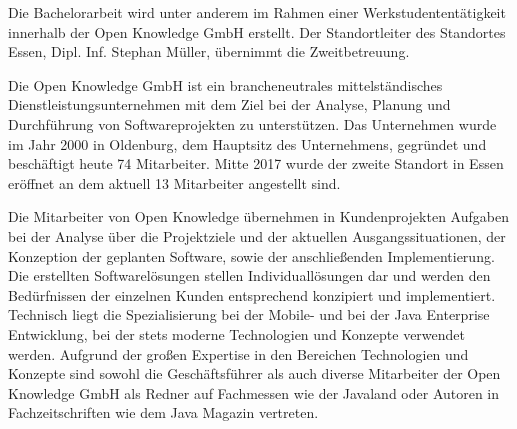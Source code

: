
Die Bachelorarbeit wird unter anderem im Rahmen einer Werkstudententätigkeit innerhalb der Open Knowledge GmbH erstellt. Der Standortleiter des Standortes Essen, Dipl. Inf. Stephan Müller, übernimmt die Zweitbetreuung.

Die Open Knowledge GmbH ist ein brancheneutrales mittelständisches Dienstleistungsunternehmen mit dem Ziel bei der Analyse, Planung und Durchführung von Softwareprojekten zu unterstützen. Das Unternehmen wurde im Jahr 2000 in Oldenburg, dem Hauptsitz des Unternehmens, gegründet und beschäftigt heute 74 Mitarbeiter. Mitte 2017 wurde der zweite Standort in Essen eröffnet an dem aktuell 13 Mitarbeiter angestellt sind.

Die Mitarbeiter von Open Knowledge übernehmen in Kundenprojekten Aufgaben bei der Analyse über die Projektziele und der aktuellen Ausgangssituationen, der Konzeption der geplanten Software, sowie der anschließenden Implementierung. Die erstellten Softwarelösungen stellen Individuallösungen dar und werden den Bedürfnissen der einzelnen Kunden entsprechend konzipiert und implementiert. Technisch liegt die Spezialisierung bei der Mobile- und bei der Java Enterprise Entwicklung, bei der stets moderne Technologien und Konzepte verwendet werden. Aufgrund der großen Expertise in den Bereichen Technologien und Konzepte sind sowohl die Geschäftsführer als auch diverse Mitarbeiter der Open Knowledge GmbH als Redner auf Fachmessen wie der Javaland oder Autoren in Fachzeitschriften wie dem Java Magazin vertreten.%

%

\pagebreak
